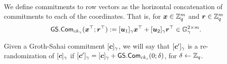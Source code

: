 We define commitments to row vectors as the horizontal concatenation of commitments to each of the coordinates. That is, for ${\boldsymbol{x}}\in\mathbb{Z}_q^m$ and ${\boldsymbol{r}}\in\mathbb{Z}_q^m$
\begin{align*}
{\mathsf{GS}}.\mathsf{Com}_{ck_\gamma}({\boldsymbol{x}}^\top;{\boldsymbol{r}}^\top) := [{\boldsymbol{u}}_1]_\gamma{\boldsymbol{x}}^\top+[{\boldsymbol{u}}_2]_\gamma{\boldsymbol{r}}^\top\in\mathbb{G}_\gamma^{2\times m}.
\end{align*}

Given a Groth-Sahai commitment $[{\boldsymbol{c}}]_\gamma$, we will say that $[{\boldsymbol{c}}']_\gamma$ is a re-randomization of $[{\boldsymbol{c}}]_\gamma$ if $[{\boldsymbol{c}}']_\gamma = [{\boldsymbol{c}}]_\gamma + {\mathsf{GS}}.\mathsf{Com}_{ck_s}(0;\delta)$, for $\delta\gets\mathbb{Z}_q$. 
